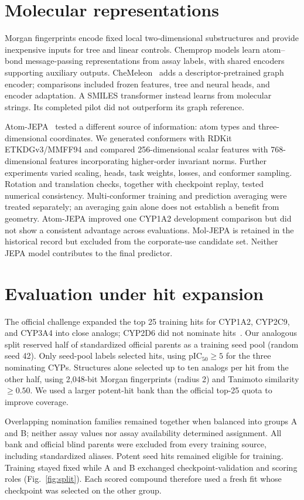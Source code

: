 \documentclass[10pt,twocolumn]{article}
\begin{document}
\section{Molecular representations}
Morgan fingerprints encode fixed local two-dimensional substructures and
provide inexpensive inputs for tree and linear controls. Chemprop models learn
atom--bond message-passing representations from assay labels, with shared
encoders supporting auxiliary outputs. CheMeleon~\cite{chemeleon} adds a
descriptor-pretrained graph encoder; comparisons included frozen features,
tree and neural heads, and encoder adaptation. A SMILES transformer instead
learns from molecular strings. Its completed pilot did not outperform its
graph reference.

Atom-JEPA~\cite{atom} tested a different source of information: atom types and
three-dimensional coordinates. We generated conformers with RDKit
ETKDGv3/MMFF94 and compared 256-dimensional scalar features with
768-dimensional features incorporating higher-order invariant norms. Further
experiments varied scaling, heads, task weights, losses, and conformer
sampling. Rotation and translation checks, together with checkpoint replay,
tested numerical consistency. Multi-conformer training and prediction
averaging were treated separately; an averaging gain alone does not establish
a benefit from geometry. Atom-JEPA improved one CYP1A2 development comparison
but did not show a consistent advantage across evaluations. Mol-JEPA is
retained in the historical record but excluded from the corporate-use
candidate set. Neither JEPA model contributes to the final predictor.

\section{Evaluation under hit expansion}
The official challenge expanded the top 25 training hits for CYP1A2, CYP2C9,
and CYP3A4 into close analogs; CYP2D6 did not nominate hits~\cite{challenge}.
Our analogous split reserved half of standardized official parents as a
training seed pool (random seed 42). Only seed-pool labels selected hits, using
pIC$_{50}\geq5$ for the three nominating CYPs. Structures alone selected up to
ten analogs per hit from the other half, using 2,048-bit Morgan fingerprints
(radius 2) and Tanimoto similarity $\geq0.50$. We used a larger potent-hit bank
than the official top-25 quota to improve coverage.

Overlapping nomination families remained together when balanced into groups
A and B; neither assay values nor assay availability determined assignment.
All bank and official blind parents were excluded from every training source,
including standardized aliases. Potent seed hits remained eligible for training.
Training stayed fixed while A and B exchanged checkpoint-validation and scoring
roles (Fig.~\ref{fig:split}). Each scored compound therefore used a fresh fit
whose checkpoint was selected on the other group.
\end{document}

